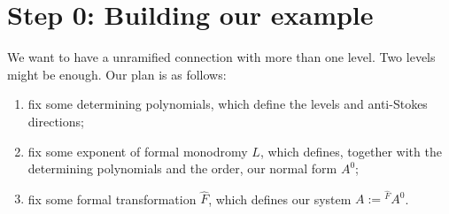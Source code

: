 \section{Step 0: Building our example}
We want to have a unramified connection with more than one level. Two levels
might be enough. Our plan is as follows:
\begin{enumerate}
  \item fix some determining polynomials, which define the levels and
    anti-Stokes directions;
  \item fix some exponent of formal monodromy $L$, which defines, together with
    the determining polynomials and the order, our normal form $A^0$;
  \item fix some formal transformation $\hat F$, which defines our system
    $A:={}^{\hat F}\!A^0$.
\end{enumerate}

